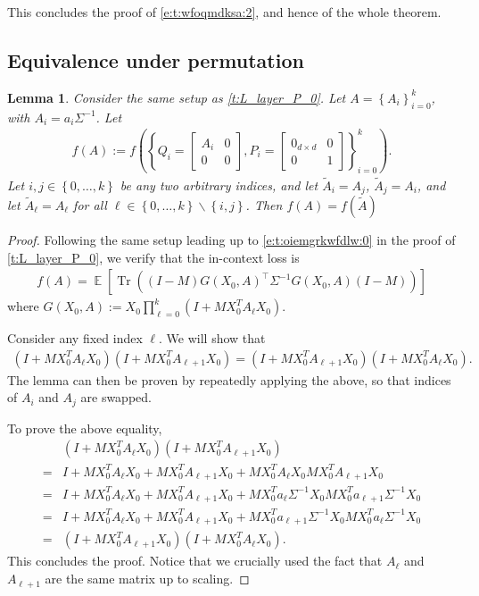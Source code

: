 \documentclass{article}
\DeclareMathOperator{\E}{\mathbb{E}}
\newtheorem{lemma}{Lemma}
\DeclareMathOperator{\tr}{Tr}
\newcommand*\lrb[1]{\left[ #1 \right]}
\newcommand*\lrp[1]{\left( #1 \right)}
\newcommand*\lrbb[1]{\left\{ #1 \right\}}
\begin{document}
This concludes the proof of \eqref{e:t:wfoqmdksa:2}, and hence of the whole theorem.





\subsection{Equivalence under permutation} 

\begin{lemma}
\label{l:bar}
Consider the same setup as \autoref{t:L_layer_P_0}. Let $A = \lrbb{A_i}_{i=0}^k$, with $A_i = a_i \Sigma^{-1}$. Let 
\begin{align}
    f(A) := f \lrp{ \left\{ Q_i = \begin{bmatrix}
A_i & 0 \\ 
0 & 0
\end{bmatrix}, P_i = \begin{bmatrix}
0_{d\times d} & 0 \\ 
0 & 1 
\end{bmatrix}\right\}_{i=0}^k}.
\end{align}
Let $i,j \in \lrbb{0, \dots, k}$ be any two arbitrary indices, and let $\tilde{A}_i = A_j$, $\tilde{A}_j = A_i$, and let $\tilde{A}_{\ell} = A_\ell$ for all $\ell \in \lrbb{0,\dots ,k} \backslash \lrbb{i,j}$. Then $f(A) = f(\tilde{A})$
\end{lemma}
\begin{proof}
Following the same setup leading up to \eqref{e:t:oiemgrkwfdlw:0} in the proof of \autoref{t:L_layer_P_0}, we verify that the in-context loss is 
\begin{align*}
f(A) = \E \lrb{\tr\lrp{\lrp{I-M} G(X_0,A)^\top \Sigma^{-1} G(X_0,A)\lrp{I-M}}}
\end{align*}
where $G(X_0,A) := X_0 \prod_{\ell=0}^{k} \lrp{I + M X_0^T A_\ell X_0}$.

Consider any fixed index $\ell$. We will show that
\begin{align*}
\lrp{I + M X_0^T A_{\ell} X_0} \lrp{I + M X_0^T A_{\ell+1} X_0}
= \lrp{I + M X_0^T A_{\ell+1} X_0} \lrp{I + M X_0^T A_{\ell} X_0}.
\end{align*}
The lemma can then be proven by repeatedly applying the above, so that indices of $A_i$ and $A_j$ are swapped.

To prove the above equality, 
\begin{align*}
& \lrp{I + M X_0^T A_{\ell} X_0} \lrp{I + M X_0^T A_{\ell+1} X_0}\\
=& I + M X_0^T A_{\ell} X_0 + M X_0^T A_{\ell+1} X_0 + M X_0^T A_{\ell} X_0M X_0^T A_{\ell+1} X_0\\
=& I + M X_0^T A_{\ell} X_0 + M X_0^T A_{\ell+1} X_0 + M X_0^T a_{\ell} \Sigma^{-1} X_0M X_0^T a_{\ell+1} \Sigma^{-1} X_0\\
=& I + M X_0^T A_{\ell} X_0 + M X_0^T A_{\ell+1} X_0 + M X_0^T a_{\ell+1} \Sigma^{-1} X_0M X_0^T a_{\ell} \Sigma^{-1} X_0\\
=& \lrp{I + M X_0^T A_{\ell+1} X_0} \lrp{I + M X_0^T A_{\ell} X_0}.
\end{align*}
This concludes the proof. Notice that we crucially used the fact that $A_\ell$ and $A_{\ell+1}$ are the same matrix up to scaling.
\end{proof}
\end{document}
